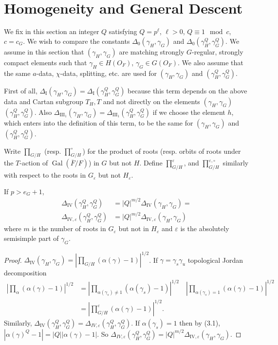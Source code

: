 \documentclass{amsart}
\newenvironment{cthm}[1]
  {\renewcommand\thethm{\bf #1}\thm}
  {\endthm}
\def\Gal{\operatorname{\text{Gal}}}          %
\def\varep{\varepsilon}
\def\hgam{\gamma_H}
\def\ggam{\gamma_G}
\begin{document}
\section{Homogeneity and General Descent} %

We fix in this section an integer $Q$ satisfying $Q=p^\ell$, $\ell>0$, $Q\equiv 1
\mod c$, $c=c_G$.
We wish to compare the constants
$\Delta_0(\hgam,\ggam)$ and  $\Delta_0(\hgam^Q,\ggam^Q)$.
We assume in this section that
$(\hgam,\ggam)$ are matching strongly $G$-regular, strongly compact elements
such that $\hgam\in H(O_F)$,
$\ggam\in G(O_F)$.  
We also assume that the same $a$-data,
$\chi$-data, splitting, etc. are used for
$(\hgam,\ggam)$ and $(\hgam^Q,\ggam^Q)$.

First of all, $\Delta_{\text{I}}(\hgam,\ggam)=
\Delta_{\text{I}}(\hgam^Q,\ggam^Q)$
because this term depends on the above data and
Cartan subgroup $T_H,T$ and not directly on the 
elements $(\hgam,\ggam)$\ $(\hgam^Q,\ggam^Q)$.
Also $\Delta_{\text{III}_1}(\hgam,\ggam) =
\Delta_{\text{III}_1}(\hgam^Q,\ggam^Q)$
if we choose the element $h$, which enters into the
definition of this term, to be the same for
$(\hgam,\ggam)$ and $(\hgam^Q,\ggam^Q)$.

Write $\prod_{G/H}$ (resp. $\prod_{G/H}^{\circ}$) for the product of roots 
(resp. orbits of roots under the $T$-action of $\Gal(\overline F/F)$)
in $G$ but not $H$.  Define $\prod_{G/H}^\varep$, and $\prod_{G/H}^{\varep,\circ}$
similarly with respect to the roots in $G_\varep$ but not $H_\varep$.

\begin{cthm}{Lemma 10.1}  If $p>e_G+1$, 
$$
\begin{array}{lll}
\Delta_{\text{IV}}(\hgam^Q,\ggam^Q) 
&= |Q|^{m/2}\Delta_{\text{IV}}(\hgam,\ggam)=\\
\Delta_{\text{IV},\varep}
(\hgam^Q,\ggam^Q)
&=|Q|^{m/2}\Delta_{\text{IV},\varep}(\hgam,\ggam)
\end{array}
$$
where $m$ is the number of roots in $G_\varep$
but not in $H_\varep$ and $\varep$ is the absolutely semisimple part 
of $\ggam$.
\end{cthm}

\begin{proof}  $\Delta_{\text{IV}}(\hgam,\ggam)
=|\prod_{G/H}(\alpha(\gamma)-1)|^{1/2}$. If
$\gamma=\gamma_s\gamma_u$ topological Jordan decomposition
$$
\begin{array}{lll}
|\prod_\alpha(\alpha(\gamma)-1)|^{1/2}
&= |
\prod_{ \alpha(\gamma_s)\ne1}
(\alpha(\gamma_s)-1)|^{1/2}\quad
|\prod_{\alpha(\gamma_s)=1}
(\alpha(\gamma)-1)|^{1/2}\\
&=
|\prod_{G/H}^\varep(\alpha(\gamma)-1)|^{1/2}.
\end{array}
$$
Similarly, $\Delta_{\text{IV}}(\hgam^Q,\ggam^Q)=\Delta_{IV,\varep}
(\hgam^Q,\ggam^Q)$. If
$\alpha(\gamma_s)=1$ then by (3.1),
$|\alpha(\gamma)^Q-1|
=|Q||\alpha(\gamma)-1|$.
So
$\Delta_{IV,\varep}(\hgam^Q,\ggam^Q)
=|Q|^{m/2}\Delta_{\text{IV},\varep}(\hgam,\ggam)$.
\end{proof}
\end{document}
